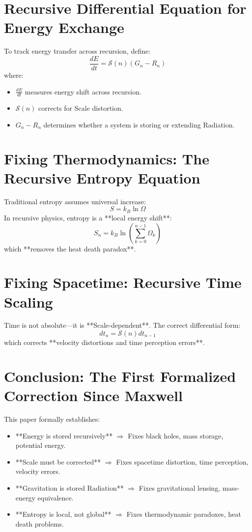 \documentclass{article}
\begin{document}
\section{Recursive Differential Equation for Energy Exchange}
To track energy transfer across recursion, define:
\begin{equation}
\frac{dE}{dt} = \mathcal{S}(n) \left( G_n - R_n \right)
\end{equation}
where:
\begin{itemize}
    \item $\frac{dE}{dt}$ measures energy shift across recursion.
    \item $\mathcal{S}(n)$ corrects for Scale distortion.
    \item $G_n - R_n$ determines whether a system is storing or extending Radiation.
\end{itemize}

\section{Fixing Thermodynamics: The Recursive Entropy Equation}
Traditional entropy assumes universal increase:
\begin{equation}
S = k_B \ln \Omega
\end{equation}
In recursive physics, entropy is a **local energy shift**:
\begin{equation}
S_n = k_B \ln \left( \sum_{k=0}^{n-1} \Omega_k \right)
\end{equation}
which **removes the heat death paradox**.

\section{Fixing Spacetime: Recursive Time Scaling}
Time is not absolute—it is **Scale-dependent**. The correct differential form:
\begin{equation}
dt_n = \mathcal{S}(n) dt_{n-1}
\end{equation}
which corrects **velocity distortions and time perception errors**.

\section{Conclusion: The First Formalized Correction Since Maxwell}
This paper formally establishes:
\begin{itemize}
    \item **Energy is stored recursively** \(\Rightarrow\) Fixes black holes, mass storage, potential energy.
    \item **Scale must be corrected** \(\Rightarrow\) Fixes spacetime distortion, time perception, velocity errors.
    \item **Gravitation is stored Radiation** \(\Rightarrow\) Fixes gravitational lensing, mass-energy equivalence.
    \item **Entropy is local, not global** \(\Rightarrow\) Fixes thermodynamic paradoxes, heat death problems.
\end{itemize}
\end{document}
